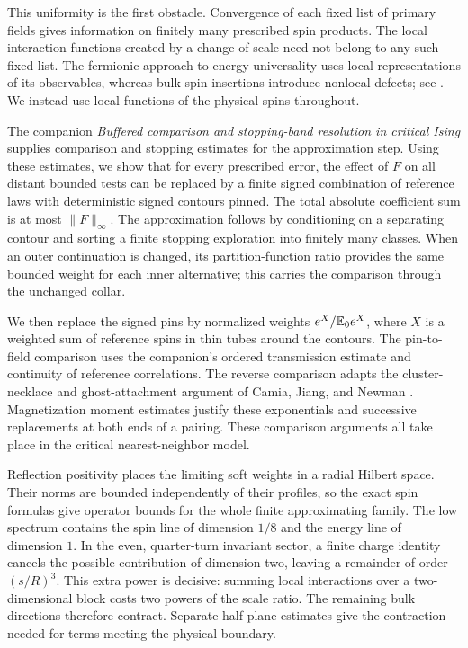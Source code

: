 This uniformity is the first obstacle. Convergence of each fixed list
of primary fields gives information on finitely many prescribed spin
products. The local interaction functions created by a change of scale
need not belong to any such fixed list. The fermionic approach to energy
universality uses local representations of its observables, whereas
bulk spin insertions introduce nonlocal defects; see
\cite{GGM2012,AGG2023}. We instead use local functions of the physical
spins throughout.

The companion \emph{Buffered comparison and stopping-band resolution
in critical Ising} \cite{IsingToolkit} supplies comparison and stopping
estimates for the approximation step. Using these estimates, we show
that for every prescribed error, the effect of $F$ on all distant
bounded tests can be replaced by a finite signed combination of reference
laws with deterministic signed contours pinned. The total absolute
coefficient sum is at most $\|F\|_\infty$. The approximation follows by
conditioning on a separating contour and sorting a finite stopping
exploration into finitely many classes. When an outer continuation is
changed, its partition-function ratio provides the same bounded weight
for each inner alternative; this carries the comparison through the
unchanged collar.

We then replace the signed pins by normalized weights $e^X/\mathbb E_0e^X$,
where $X$ is a weighted sum of reference spins in thin tubes around the
contours. The pin-to-field comparison uses the companion's ordered
transmission estimate and continuity of reference correlations. The
reverse comparison adapts the cluster-necklace and ghost-attachment
argument of Camia, Jiang, and Newman \cite{CJN2020}. Magnetization moment
estimates \cite{CGN2015} justify these exponentials and successive
replacements at both ends of a pairing. These comparison arguments
all take place in the critical nearest-neighbor model.

Reflection positivity places the limiting soft weights in a radial
Hilbert space. Their norms are bounded independently of their profiles,
so the exact spin formulas give operator bounds for the whole finite
approximating family. The low spectrum contains the spin line of
dimension $1/8$ and the energy line of dimension $1$. In the even,
quarter-turn invariant sector, a finite charge identity cancels the
possible contribution of dimension two, leaving a remainder of order
$(s/R)^3$. This extra power is decisive: summing local interactions over
a two-dimensional block costs two powers of the scale ratio. The
remaining bulk directions therefore contract. Separate half-plane
estimates give the contraction needed for terms meeting the physical
boundary.

